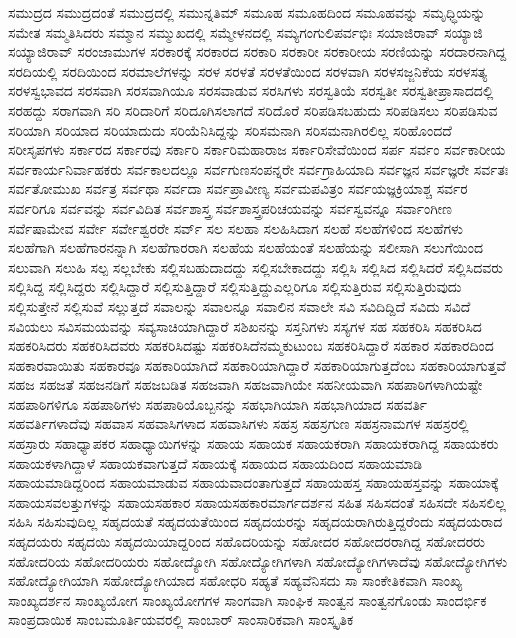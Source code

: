 {ಸಮುದ್ರದ
ಸಮುದ್ರದಂತೆ
ಸಮುದ್ರದಲ್ಲಿ
ಸಮುನ್ನತಿಮ್
ಸಮೂಹ
ಸಮೂಹದಿಂದ
ಸಮೂಹವನ್ನು
ಸಮೃಧ್ಧಿಯನ್ನು
ಸಮೇತ
ಸಮ್ಮತಿಸಿದರು
ಸಮ್ಮಾನ
ಸಮ್ಮುಖದಲ್ಲಿ
ಸಮ್ಮೇಳನದಲ್ಲಿ
ಸಮ್ಯಗಂಗುಲಿಪರ್ವಭಿಃ
ಸಯಾಜಿರಾವ್
ಸಯ್ಯಾಜಿ
ಸಯ್ಯಾಜಿರಾವ್
ಸರಂಜಾಮುಗಳ
ಸರಕಾರಕ್ಕೆ
ಸರಕಾರದ
ಸರಕಾರಿ
ಸರಕಾರೀ
ಸರಕಾರೀಯ
ಸರಣಿಯನ್ನು
ಸರದಾರನಾಗಿದ್ದ
ಸರದಿಯಲ್ಲಿ
ಸರದಿಯಿಂದ
ಸರಮಾಲೆಗಳನ್ನು
ಸರಳ
ಸರಳತೆ
ಸರಳತೆಯಿಂದ
ಸರಳವಾಗಿ
ಸರಳಸಜ್ಜನಿಕೆಯ
ಸರಳಸತ್ಯ
ಸರಳಸ್ವಭಾವದ
ಸರಸವಾಗಿ
ಸರಸವಾಗಿಯೂ
ಸರಸವಾಡುವ
ಸರಸಿಗಳು
ಸರಸ್ವತಿಯೆ
ಸರಸ್ವತೀ
ಸರಸ್ವತೀಪ್ರಾಸಾದದಲ್ಲಿ
ಸರಹದ್ದು
ಸರಾಗವಾಗಿ
ಸರಿ
ಸರಿದಾರಿಗೆ
ಸರಿದೂಗಿಸಲಾಗದೆ
ಸರಿದೊರೆ
ಸರಿಪಡಿಸಬಹುದು
ಸರಿಪಡಿಸಲು
ಸರಿಪಡಿಸುವ
ಸರಿಯಾಗಿ
ಸರಿಯಾದ
ಸರಿಯಾದುದು
ಸರಿಯೆನಿಸಿದ್ದನ್ನು
ಸರಿಸಮನಾಗಿ
ಸರಿಸಮನಾಗಿರಲಿಲ್ಲ
ಸರಿಹೊಂದದೆ
ಸರೀಸೃಪಗಳು
ಸರ್ಕಾರದ
ಸರ್ಕಾರವು
ಸರ್ಕಾರಿ
ಸರ್ಕಾರಿಮಹಾರಾಜ
ಸರ್ಕಾರಿಸೇವೆಯಿಂದ
ಸರ್ಪ
ಸರ್ವಂ
ಸರ್ವಕಾರೀಯ
ಸರ್ವಕಾರ್ಯನಿರ್ವಾಹಕರು
ಸರ್ವಕಾಲದಲ್ಲೂ
ಸರ್ವಗುಣಸಂಪನ್ನರೇ
ಸರ್ವಗ್ರಾಹಿಯಾದಿ
ಸರ್ವಜ್ಞನ
ಸರ್ವಜ್ಞರೇ
ಸರ್ವತಃ
ಸರ್ವತೋಮುಖ
ಸರ್ವತ್ರ
ಸರ್ವಥಾ
ಸರ್ವದಾ
ಸರ್ವಪ್ರಾವೀಣ್ಯ
ಸರ್ವಮಪವಿತ್ರಂ
ಸರ್ವಯಜ್ಞಕ್ರಿಯಾಶ್ಚ
ಸರ್ವರ
ಸರ್ವರಿಗೂ
ಸರ್ವವನ್ನು
ಸರ್ವವಿದಿತ
ಸರ್ವಶಾಸ್ತ್ರ
ಸರ್ವಶಾಸ್ತ್ರಪರಿಚಯವನ್ನು
ಸರ್ವಸ್ವವನ್ನೂ
ಸರ್ವಾಂಗೀಣ
ಸರ್ವೆಷಾಮೇವ
ಸರ್ವೇ
ಸರ್ವೇಶ್ವರರೇ
ಸರ್ವ್
ಸಲ
ಸಲಹಾ
ಸಲಹಿಸಿದಾಗ
ಸಲಹೆ
ಸಲಹೆಗಳಿಂದ
ಸಲಹೆಗಳು
ಸಲಹೆಗಾಗಿ
ಸಲಹೆಗಾರನನ್ನಾಗಿ
ಸಲಹೆಗಾರರಾಗಿ
ಸಲಹೆಯ
ಸಲಹೆಯಂತೆ
ಸಲಹೆಯನ್ನು
ಸಲೀಸಾಗಿ
ಸಲುಗೆಯಿಂದ
ಸಲುವಾಗಿ
ಸಲುಹಿ
ಸಲ್ಪ
ಸಲ್ಲಬೇಕು
ಸಲ್ಲಿಸಬಹುದಾದದ್ದು
ಸಲ್ಲಿಸಬೇಕಾದದ್ದು
ಸಲ್ಲಿಸಿ
ಸಲ್ಲಿಸಿದ
ಸಲ್ಲಿಸಿದರೆ
ಸಲ್ಲಿಸಿದವರು
ಸಲ್ಲಿಸಿದ್ದ
ಸಲ್ಲಿಸಿದ್ದರು
ಸಲ್ಲಿಸಿದ್ದಾರೆ
ಸಲ್ಲಿಸುತ್ತಿದ್ದಾರೆ
ಸಲ್ಲಿಸುತ್ತಿದ್ದುಎಲ್ಲರಿಗೂ
ಸಲ್ಲಿಸುತ್ತಿರುವ
ಸಲ್ಲಿಸುತ್ತಿರುವುದು
ಸಲ್ಲಿಸುತ್ತೇನೆ
ಸಲ್ಲಿಸುವೆ
ಸಲ್ಲುತ್ತದೆ
ಸವಾಲನ್ನು
ಸವಾಲನ್ನೂ
ಸವಾಲಿನ
ಸವಾಲೇ
ಸವಿ
ಸವಿದಿದ್ದಿದೆ
ಸವಿದು
ಸವಿದೆ
ಸವಿಯಲು
ಸವಿಸಮಯವನ್ನು
ಸವ್ಯಸಾಚಿಯಾಗಿದ್ದಾರೆ
ಸಶಿಖನನ್ನು
ಸಸ್ತನಿಗಳು
ಸಸ್ಯಗಳ
ಸಹ
ಸಹಕರಿಸಿ
ಸಹಕರಿಸಿದ
ಸಹಕರಿಸಿದರು
ಸಹಕರಿಸಿದವರು
ಸಹಕರಿಸಿದಷ್ಟು
ಸಹಕರಿಸಿದೆನಮ್ಮಕುಟುಂಬ
ಸಹಕರಿಸಿದ್ದಾರೆ
ಸಹಕಾರ
ಸಹಕಾರದಿಂದ
ಸಹಕಾರವಾಯಿತು
ಸಹಕಾರವೂ
ಸಹಕಾರಿಯಾಗಿದೆ
ಸಹಕಾರಿಯಾಗಿದ್ದಾರೆ
ಸಹಕಾರಿಯಾಗುತ್ತದೆಂಬ
ಸಹಕಾರಿಯಾಗುತ್ತವೆ
ಸಹಜ
ಸಹಜತೆ
ಸಹಜನಡಿಗೆ
ಸಹಜಬಡಿತ
ಸಹಜವಾಗಿ
ಸಹಜವಾಗಿಯೇ
ಸಹನೀಯವಾಗಿ
ಸಹಪಾಠಿಗಳಾಗಿಯಷ್ಟೇ
ಸಹಪಾಠಿಗಳಿಗೂ
ಸಹಪಾಠಿಗಳು
ಸಹಪಾಠಿಯೊಬ್ಬನನ್ನು
ಸಹಭಾಗಿಯಾಗಿ
ಸಹಭಾಗಿಯಾದ
ಸಹವರ್ತಿ
ಸಹವರ್ತಿಗಳಾದೆವು
ಸಹವಾಸ
ಸಹವಾಸಿಗಳಾದ
ಸಹವಾಸಿಗಳು
ಸಹಸ್ರ
ಸಹಸ್ರಗುಣ
ಸಹಸ್ರನಾಮಗಳ
ಸಹಸ್ರರಲ್ಲಿ
ಸಹಸ್ರಾರು
ಸಹಾಧ್ಯಾಪಕರ
ಸಹಾಧ್ಯಾಯಿಗಳನ್ನು
ಸಹಾಯ
ಸಹಾಯಕ
ಸಹಾಯಕರಾಗಿ
ಸಹಾಯಕರಾಗಿದ್ದ
ಸಹಾಯಕರು
ಸಹಾಯಕಳಾಗಿದ್ದಾಳೆ
ಸಹಾಯಕವಾಗುತ್ತದೆ
ಸಹಾಯಕ್ಕೆ
ಸಹಾಯದ
ಸಹಾಯದಿಂದ
ಸಹಾಯಮಾಡಿ
ಸಹಾಯಮಾಡಿದ್ದರಿಂದ
ಸಹಾಯಮಾಡುವ
ಸಹಾಯವಾದಂತಾಗುತ್ತದೆ
ಸಹಾಯಹಸ್ತ
ಸಹಾಯಹಸ್ತವನ್ನು
ಸಹಾಯಾಕ್ಕೆ
ಸಹಾಯಸವಲತ್ತುಗಳನ್ನು
ಸಹಾಯಸಹಕಾರ
ಸಹಾಯಸಹಕಾರಮಾರ್ಗದರ್ಶನ
ಸಹಿತ
ಸಹಿಸದಂತೆ
ಸಹಿಸದೇ
ಸಹಿಸಲಿಲ್ಲ
ಸಹಿಸಿ
ಸಹಿಸುವುದಿಲ್ಲ
ಸಹೃದಯತೆ
ಸಹೃದಯತೆಯಿಂದ
ಸಹೃದಯರನ್ನು
ಸಹೃದಯರಾಗಿರುತ್ತಿದ್ದರೆಂದು
ಸಹೃದಯರಾದ
ಸಹೃದಯರು
ಸಹೃದಯಿ
ಸಹೃದಯಿಯಾದ್ದರಿಂದ
ಸಹೊದರಿಯನ್ನು
ಸಹೋದರ
ಸಹೋದರರಾಗಿದ್ದ
ಸಹೋದರರು
ಸಹೋದರಿಯ
ಸಹೋದರಿಯರು
ಸಹೋದ್ಯೋಗಿ
ಸಹೋದ್ಯೋಗಿಗಳಾಗಿ
ಸಹೋದ್ಯೋಗಿಗಳಾದೆವು
ಸಹೋದ್ಯೋಗಿಗಳು
ಸಹೋದ್ಯೋಗಿಯಾಗಿ
ಸಹೋದ್ಯೋಗಿಯಾದ
ಸಹೋಧರಿ
ಸಹ್ಯತೆ
ಸಹ್ಯವೆನಿಸದು
ಸಾ
ಸಾಂಕೇತಿಕವಾಗಿ
ಸಾಂಖ್ಯ
ಸಾಂಖ್ಯದರ್ಶನ
ಸಾಂಖ್ಯಯೋಗ
ಸಾಂಖ್ಯಯೋಗಗಳ
ಸಾಂಗವಾಗಿ
ಸಾಂಘಿಕ
ಸಾಂತ್ವನ
ಸಾಂತ್ವನಗೊಂಡು
ಸಾಂದರ್ಭಿಕ
ಸಾಂಪ್ರದಾಯಿಕ
ಸಾಂಬಮೂರ್ತಿಯವರಲ್ಲಿ
ಸಾಂಬಾರ್
ಸಾಂಸಾರಿಕವಾಗಿ
ಸಾಂಸ್ಕೃತಿಕ
}
